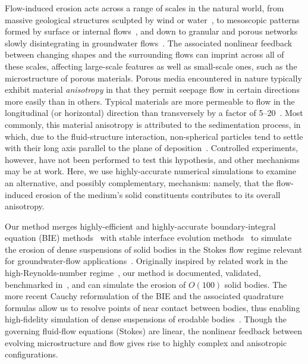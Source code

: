 \documentclass[3p]{elsarticle}
\begin{document}
Flow-induced erosion acts across a range of scales in the natural world, from massive geological structures sculpted by wind or water~\cite{abrams2009growth, perkins2015amplification, mac2020ultra, sharma2022alcove, mac2022morphological}, to mesoscopic patterns formed by surface or internal flows~\cite{berhanu2012shape, bertagni2021hydrodynamic, weady2022anomalous}, and down to granular and porous networks slowly disintegrating in groundwater flows~\cite{chiu2020viscous, szymczak2009wormhole, jager2017channelization, grodzki2019reactive, bizmark2020multiscale, derr2020flow, zareei2022temporal}. The associated nonlinear feedback between changing shapes and the surrounding flows can imprint across all of these scales, affecting large-scale features as well as small-scale ones, such as the microstructure of porous materials. Porous media encountered in nature typically exhibit material {\em anisotropy} in that they permit seepage flow in certain directions more easily than in others. Typical materials are more permeable to flow in the longitudinal (or horizontal) direction than transversely by a factor of 5--20~\cite{bear1988dynamics, anderson2015applied}. Most commonly, this material anisotropy is attributed to the sedimentation process, in which, due to the fluid-structure interaction, non-spherical particles tend to settle with their long axis parallel to the plane of deposition~\cite{bear1988dynamics}. Controlled experiments, however, have not been performed to test this hypothesis, and other mechanisms may be at work. Here, we use highly-accurate numerical simulations to examine an alternative, and possibly complementary, mechanism: namely, that the flow-induced erosion of the medium's solid constituents contributes to its overall anisotropy.

Our method merges highly-efficient and highly-accurate boundary-integral equation (BIE) methods~\cite{baker1986boundary, moore2007evaluation, gray2019boundary} with stable interface evolution methods~\cite{hou-low-she1994, Moore2013} to simulate the erosion of dense suspensions of solid bodies in the Stokes flow regime relevant for groundwater-flow applications~\cite{quaife2018boundary, chiu2020viscous}. Originally inspired by related work in the high-Reynolds-number regime~\cite{Ristroph2012, Moore2013, Huang2015, MooreCPAM2017}, our method is documented, validated, benchmarked in~\cite{quaife2018boundary}, and can simulate the erosion of $O(100)$ solid bodies. The more recent Cauchy reformulation of the BIE and the associated quadrature formulas allow us to resolve points of near contact between bodies, thus enabling high-fidelity simulation of dense suspensions of erodable bodies~\cite{chiu2020viscous}. Though the governing fluid-flow equations (Stokes) are linear, the nonlinear feedback between evolving microstructure and flow gives rise to highly complex and anisotropic configurations.
	
\end{document}
